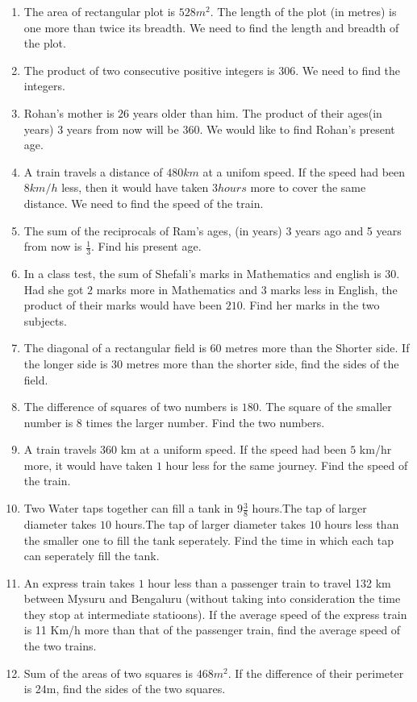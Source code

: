 \begin{enumerate}[label=\thesubsection.\arabic*,ref=\thesubsection.\theenumi,resume*]
\item The area of rectangular plot is $528m^2$. The length of the plot (in metres) is one more than twice its breadth. We need to find the length and breadth of the plot.
\item The product of two consecutive positive integers is $306$. We need to find the integers.
\item Rohan's mother is $26$ years older than him. The product of their ages(in years) $3$ years from now will be $360$. We would like to find Rohan's present age.
\item A train travels a distance of $480km$ at a unifom speed. If the speed had been $8km/h$ less, then it would have taken $3 hours$ more to cover the same distance. We need to find the speed of the train.
\item The sum of the reciprocals of Ram's ages, (in years) 3 years ago and 5 years from now is $\frac{1}{3}$. Find his present age.
\item In a class test, the sum of Shefali's  marks in Mathematics and english is $30$. Had she got $2$ marks more in Mathematics and $3$ marks less in English, the product of their marks would have been $210$. Find her marks in the two subjects. 
\item The diagonal of a rectangular field is $60$ metres more than the Shorter side. If the longer side is $30$ metres more than the shorter side, find the sides of the field.
\item The difference of squares of two numbers is $180$. The square of the smaller number is $8$ times the larger number. Find the two numbers.
\item A train travels $360$ km at a uniform speed. If the speed had been $5$ km/hr more, it would have taken $1$ hour less for the same journey. Find the speed of the train.
\item Two Water taps together can fill a tank in $9\frac{3}{8}$ hours.The tap of larger diameter takes $10$ hours.The tap of larger diameter takes $10$ hours less than the smaller one to fill the tank seperately. Find the time in which each tap can seperately fill the  tank.
\item An express train takes $1$ hour less than a passenger train to travel 132 km between Mysuru and Bengaluru (without taking into consideration the time they stop at intermediate statioons). If the average speed of the express train is 11 Km/h more than that of the passenger train, find the average speed of the two trains.
\item Sum of the areas of two squares is $468m^2$. If the difference of their perimeter is 24m, find the sides of the two squares.  

\end{enumerate}
